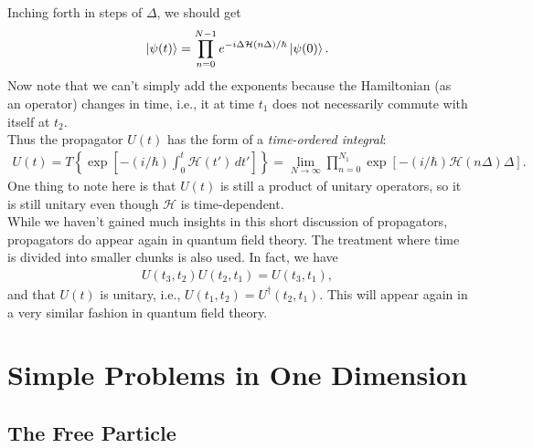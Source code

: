 \documentclass{book}
\theoremstyle{definition}
\newcommand{\ham}{\mathcal{H}}
\newcommand{\lb}{\left[}
\newcommand{\rb}{\right]}
\newcommand{\lc}{\left\{}
\newcommand{\rc}{\right\}}
\begin{document}
Inching forth in steps of $\Delta$, we should get
\begin{align}
\ket{\psi(t)} = \prod_{n=0}^{N-1} e^{-i\Delta \ham(n\Delta) / \hbar} \ket{\psi(0)}.
\end{align}
Now note that we can't simply add the exponents because the Hamiltonian (as an operator) changes in time, i.e., it at time $t_1$ does not necessarily commute with itself at $t_2$. \\

Thus the propagator $U(t)$ has the form of a \textit{time-ordered integral}:
\begin{align}
U(t) = T\lc \exp\lb -(i/\hbar) \int_0^t \ham(t')\,dt' \rb \rc = \lim_{N\to \infty} \prod_{n=0}^{N_1} \exp\lb -(i/\hbar)\ham(n\Delta)\Delta \rb.
\end{align}
One thing to note here is that $U(t)$ is still a product of unitary operators, so it is still unitary even though $\ham$ is time-dependent. \\

While we haven't gained much insights in this short discussion of propagators, propagators do appear again in quantum field theory. The treatment where time is divided into smaller chunks is also used. In fact, we have
\begin{align}
U(t_3, t_2)U(t_2,t_1) = U(t_3,t_1),
\end{align}
and that $U(t)$ is unitary, i.e., $U(t_1,t_2) = U^\dagger(t_2,t_1)$. This will appear again in a very similar fashion in quantum field theory. 
















\newpage



\section{Simple Problems in One Dimension}

\subsection{The Free Particle}
\end{document}
